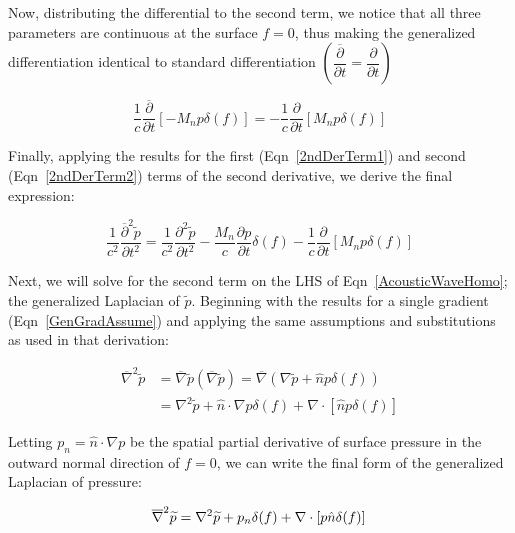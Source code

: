 \documentclass[]{aiaa-tc}%
\begin{document}
Now, distributing the differential to the second term, we notice that all three parameters are continuous at the surface $f=0$, thus making the generalized differentiation identical to standard differentiation $\left(\dfrac{\overline{\partial}}{\partial t} = \dfrac{\partial}{\partial t} \right)$

\begin{equation} \label{2ndDerTerm2}
\dfrac{1}{c}\dfrac{\overline{\partial}}{\partial t}\left[-M_n p\delta(f)\right]
    = -\dfrac{1}{c}\dfrac{\partial}{\partial t} \left[ M_n p\delta(f) \right]
\end{equation}

Finally, applying the results for the first (Eqn~\ref{2ndDerTerm1}) and second (Eqn~\ref{2ndDerTerm2}) terms of the second derivative, we derive the final expression:

\begin{equation} \label{2ndDer}
\dfrac{1}{c^2}\dfrac{\overline{\partial}^2\widetilde{p}}{\partial t^2}
= \dfrac{1}{c^2} \dfrac{\partial^2\widetilde{p}}{\partial t^2}
    - \dfrac{M_n}{c} \dfrac{\partial p}{\partial t}  \delta(f)
- \dfrac{1}{c}\dfrac{\partial}{\partial t} \left[ M_n p\delta(f) \right]
\end{equation}


Next, we will solve for the second term on the LHS of Eqn~\ref{AcousticWaveHomo}; the generalized Laplacian of $\widetilde{p}$.  Beginning with the results for a single gradient (Eqn~\ref{GenGradAssume}) and applying the same assumptions and substitutions as used in that derivation:

\begin{align*}
\overline{\nabla}^2 \widetilde{p}
    &= \overline{\nabla} \widetilde{p}
        \left( \overline{\nabla} \widetilde{p} \right)
    = \overline{\nabla}
        \left( \nabla\widetilde{p} + \hat{n} p \delta(f) \right) \\
&= \nabla^2\widetilde{p} + \hat{n}\cdot\nabla p \delta(f)
    + \nabla\cdot \left[ \hat{n} p \delta(f) \right]
\end{align*}

\noindent Letting $p_n = \hat{n}\cdot\nabla p$ be the spatial partial derivative of surface pressure in the outward normal direction of $f=0$, we can write the final form of the generalized Laplacian of pressure:

\begin{equation} \label{DoubleGrad}
\overline{\nabla}^2 \widetilde{p}
    = \nabla^2\widetilde{p} + p_n \delta(f)
    + \nabla\cdot \left[ p\hat{n} \delta(f) \right] \\
\end{equation}
\end{document}
